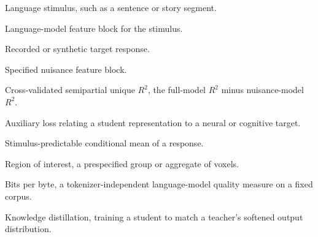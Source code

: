 \begin{description}[style=nextline,leftmargin=2.5cm] %
\item[$S$] Language stimulus, such as a sentence or story segment.
\item[$X$] Language-model feature block for the stimulus.
\item[$Y$] Recorded or synthetic target response.
\item[$Z$] Specified nuisance feature block.
\item[$\uniqueR$] Cross-validated semipartial unique $R^2$, the full-model $R^2$ minus nuisance-model $R^2$.
\item[$\Lbrain$] Auxiliary loss relating a student representation to a neural or cognitive target.
\item[$\Eys$] Stimulus-predictable conditional mean of a response.
\item[ROI] Region of interest, a prespecified group or aggregate of voxels.
\item[BPB] Bits per byte, a tokenizer-independent language-model quality measure on a fixed corpus.
\item[KD] Knowledge distillation, training a student to match a teacher's softened output distribution.
\end{description}
